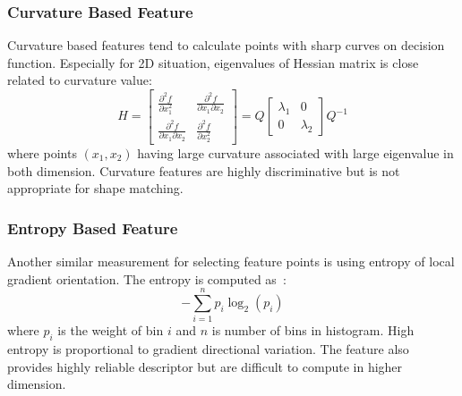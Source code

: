 \subsubsection{Curvature Based Feature}
Curvature based features tend to calculate points with sharp curves on decision function. Especially for 2D situation, eigenvalues of Hessian matrix is close related to curvature value:
\begin{equation}
\label{eq:svshessian}
H=
\begin{bmatrix}
    \frac{\partial^2f}{\partial x^2_1} & \frac{\partial^2f}{\partial x_1\partial x_2}\\
    \frac{\partial^2f}{\partial x_1\partial x_2} & \frac{\partial^2f}{\partial x^2_2}
\end{bmatrix}
=Q
\begin{bmatrix}
    \lambda_1 & 0\\
    0 & \lambda_2
\end{bmatrix}
Q^{-1}
\end{equation}
where points $(x_1,x_2)$ having large curvature associated with large eigenvalue in both dimension. Curvature features are highly discriminative but is not appropriate for shape matching.

\subsubsection{Entropy Based Feature}
Another similar measurement for selecting feature points is using entropy of local gradient orientation. The entropy is computed as~\cite{Nguyen2013}:
\begin{equation}
\label{eq:svsentropy}
-\sum_{i=1}^np_i\log_2(p_i)
\end{equation}
where $p_i$ is the weight of bin $i$ and $n$ is number of bins in histogram. High entropy is proportional to gradient directional variation. The feature also provides highly reliable descriptor but are difficult to compute in higher dimension.